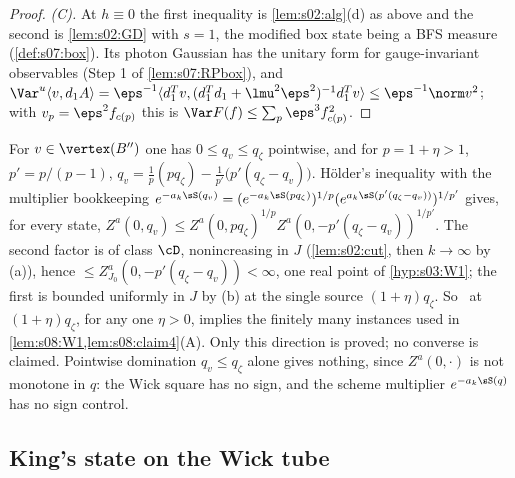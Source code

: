 \begin{proof}
\emph{(C).} At $h\equiv0$ the first inequality is \cref{lem:s02:alg}(d) as above and the second is \cref{lem:s02:GD} with $s=1$, the modified box state being a BFS measure (\cref{def:s07:box}). Its photon Gaussian has the unitary form for gauge-invariant observables (Step 1 of \cref{lem:s07:RPbox}), and $\Var^u\langle v,d_1A\rangle=\eps^{-1}\langle d_1^Tv,(d_1^Td_1+\lmu^2\eps^2)^{-1}d_1^Tv\rangle\le\eps^{-1}\norm v^2$; with $v_p=\eps^2f_{c(p)}$ this is $\Var F(f)\le\sum_p\eps^3f_{c(p)}^2$.
\end{proof}

\begin{remark}\label{rem:s08:oneinstance}
For $v\in\vertex(B'')$ one has $0\le q_v\le q_\zeta$ pointwise, and for $p=1+\eta>1$, $p'=p/(p-1)$, $q_v=\frac1p(pq_\zeta)-\frac1{p'}\big(p'(q_\zeta-q_v)\big)$. H\"older's inequality with the multiplier bookkeeping $e^{-a_k\sS(q_v)}=(e^{-a_k\sS(pq_\zeta)})^{1/p}(e^{a_k\sS(p'(q_\zeta-q_v))})^{1/p'}$ gives, for every state, $Z^a(0,q_v)\le Z^a(0,pq_\zeta)^{1/p}Z^a(0,-p'(q_\zeta-q_v))^{1/p'}$. The second factor is of class $\cD$, nonincreasing in $J$ (\cref{lem:s02:cut}, then $k\to\infty$ by \Wtwo(a)), hence $\le Z^a_{J_0}(0,-p'(q_\zeta-q_v))<\infty$, one real point of \cref{hyp:s03:W1}; the first is bounded uniformly in $J$ by \Wtwo(b) at the single source $(1+\eta)q_\zeta$. So \Wtwo\ at $(1+\eta)q_\zeta$, for any one $\eta>0$, implies the finitely many instances used in \cref{lem:s08:W1,lem:s08:claim4}(A). Only this direction is proved; no converse is claimed. Pointwise domination $q_v\le q_\zeta$ alone gives nothing, since $Z^a(0,\cdot)$ is not monotone in $q$: the Wick square has no sign, and the scheme multiplier $e^{-a_k\sS(q)}$ has no sign control.
\end{remark}

\subsection{King's state on the Wick tube}

